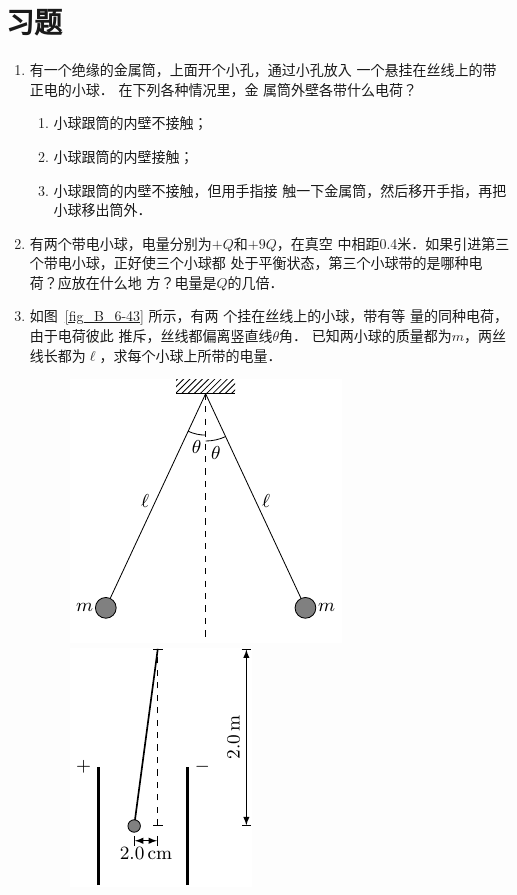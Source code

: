 \section*{习题}
\begin{enumerate}
\item 有一个绝缘的金属筒，上面开个小孔，通过小孔放入
一个悬挂在丝线上的带正电的小球．
在下列各种情况里，金
属筒外壁各带什么电荷？
\begin{enumerate}
\item 小球跟筒的内壁不接触；
\item 小球跟筒的内壁接触；
\item 小球跟筒的内壁不接触，但用手指接
触一下金属筒，然后移开手指，再把小球移出筒外．
\end{enumerate}

\item 有两个带电小球，电量分别为$+Q$和$+9Q$，在真空
中相距0.4米．如果引进第三个带电小球，正好使三个小球都
处于平衡状态，第三个小球带的是哪种电荷？应放在什么地
方？电量是$Q$的几倍．
\item 如图~\ref{fig_B_6-43} 所示，有两
个挂在丝线上的小球，带有等
量的同种电荷，由于电荷彼此
推斥，丝线都偏离竖直线$\theta$角．
已知两小球的质量都为$m$，两丝线长都为$\ell$，求每个小球上所带的电量．

\begin{figure}[htbp]
    \centering
    \begin{minipage}[t]{0.48\textwidth}
        \centering
        \includegraphics{fig/B/6-43.pdf}
        \caption{}\label{fig_B_6-43}
    \end{minipage}
    \begin{minipage}[t]{0.48\textwidth}
        \centering
        \includegraphics{fig/B/6-44.pdf}
        \caption{}\label{fig_B_6-44}
    \end{minipage}
\end{figure}




\end{enumerate}
